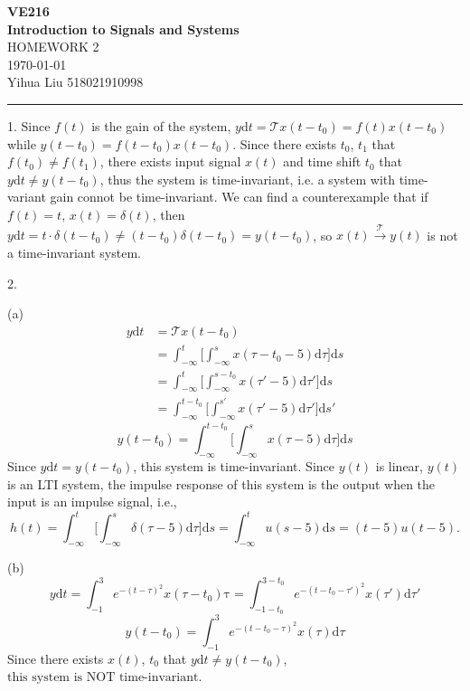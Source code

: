 \documentclass[a4paper]{article}
\begin{document}
\begin{center}
\huge
\textbf{VE216\\Introduction to Signals and Systems\\}
\Large
\vspace{30pt}
\uppercase{Homework 2}\\
\vspace{5pt}\today\\
\vspace{5pt}
Yihua Liu 518021910998
\vspace{5pt}
\rule[-10pt]{.97\linewidth}{0.05em}
\end{center}

1. Since $f(t)$ is the gain of the system, $y\mathrm{d}t=\mathcal{T}x(t-t_0)=f(t)x(t-t_0)$ while $y(t-t_0)=f(t-t_0)x(t-t_0)$. Since there exists $t_0$, $t_1$ that $f(t_0)\neq f(t_1)$, there exists input signal $x(t)$ and time shift $t_0$ that $y\mathrm{d}t\neq y(t-t_0)$, thus the system is time-invariant, i.e. a system with time-variant gain connot be time-invariant. We can find a counterexample that if $f(t)=t$, $x(t)=\delta(t)$, then $y\mathrm{d}t=t\cdot\delta(t-t_0)\neq(t-t_0)\delta(t-t_0)=y(t-t_0)$, so $x(t)\stackrel{\mathcal{T}}{\longrightarrow}y(t)$ is not a time-invariant system.

2.

(a)
\begin{align*}
    y\mathrm{d}t&=\mathcal{T}x(t-t_0)\\
    &=\int_{-\infty}^t\bigg[\int_{-\infty}^sx(\tau-t_0-5)\mathrm{d}\tau\bigg]\mathrm{d}s\\
    &=\int_{-\infty}^t\bigg[\int_{-\infty}^{s-t_0}x(\tau'-5)\mathrm{d}\tau'\bigg]\mathrm{d}s\\
    &=\int_{-\infty}^{t-t_0}\bigg[\int_{-\infty}^{s'}x(\tau'-5)\mathrm{d}\tau'\bigg]\mathrm{d}s'
\end{align*}
$$y(t-t_0)=\int_{-\infty}^{t-t_0}\bigg[\int_{-\infty}^{s}x(\tau-5)\mathrm{d}\tau\bigg]\mathrm{d}s$$
Since $y\mathrm{d}t=y(t-t_0)$, this system is time-invariant. Since $y(t)$ is linear, $y(t)$ is an LTI system, the impulse response of this system is the output when the input is an impulse signal, i.e.,
$$\boxed{h(t)=\int_{-\infty}^t\bigg[\int_{-\infty}^s\delta(\tau-5)\mathrm{d}\tau\bigg]\mathrm{d}s=\int_{-\infty}^tu(s-5)\mathrm{d}s=(t-5)u(t-5).}$$

(b)
$$y\mathrm{d}t=\int_{-1}^3e^{-(t-\tau)^2}x(\tau-t_0)\mathrm{\tau}=\int_{-1-t_0}^{3-t_0}e^{-(t-t_0-\tau')^2}x(\tau')\mathrm{d}\tau'$$
$$y(t-t_0)=\int_{-1}^3e^{-(t-t_0-\tau)^2}x(\tau)\mathrm{d}\tau$$
Since there exists $x(t)$, $t_0$ that $y\mathrm{d}t\neq y(t-t_0)$, $\boxed{\text{this system is NOT time-invariant}}$.
\end{document}

